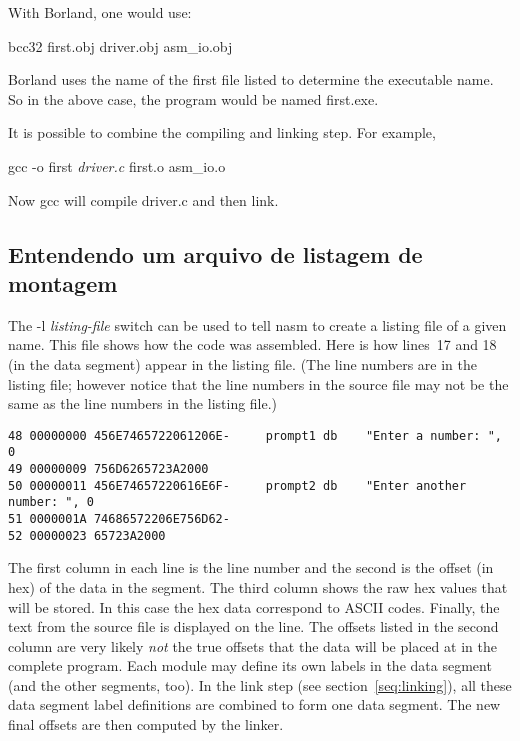 {With Borland,  one would use:
\begin{CodeQuote}
bcc32 first.obj driver.obj asm\_io.obj
\end{CodeQuote}
Borland uses the name of the first file listed to determine the executable
name. So in the above case, the program would be named {\code first.exe}.

It is possible to combine the compiling and linking step. For example,
\begin{CodeQuote}
gcc -o first {\em driver.c} first.o asm\_io.o
\end{CodeQuote}
Now {\code gcc} will compile {\code driver.c} and then link.

\subsection{Entendendo um arquivo de listagem de montagem }

The {\code -l {\em listing-file}} switch can be used to tell {\code
nasm} to create a listing file of a given name. This file shows how
the code was assembled. Here is how lines~17 and 18 (in the data
segment) appear in the listing file. (The line numbers are in the
listing file; however notice that the line numbers in the source file
may not be the same as the line numbers in the listing file.)
\begin{Verbatim}[xleftmargin=\AsmMargin]
48 00000000 456E7465722061206E-     prompt1 db    "Enter a number: ", 0
49 00000009 756D6265723A2000
50 00000011 456E74657220616E6F-     prompt2 db    "Enter another number: ", 0
51 0000001A 74686572206E756D62-
52 00000023 65723A2000
 \end{Verbatim}
The first column in each line is the line number and the second is the
offset (in hex) of the data in the segment. The third column shows the
raw hex values that will be stored. In this case the hex data
correspond to ASCII codes. Finally, the text from the source file is
displayed on the line. The offsets listed in the second column are
very likely \emph{not} the true offsets that the data will be placed
at in the complete program.  Each module may define its own labels in
the data segment (and the other segments, too). In the link step (see
section~\ref{seq:linking}), all these data segment label definitions
are combined to form one data segment. The new final offsets are then
computed by the linker.

}
